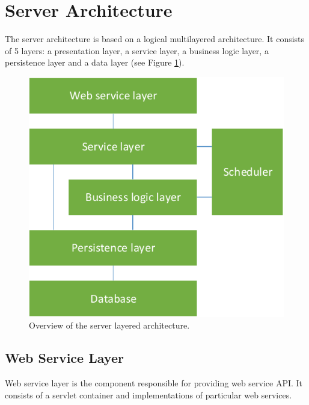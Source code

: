 

\section{Server Architecture}

The server architecture is based on a logical multilayered architecture. It
consists of 5 layers: a presentation layer, a service layer, a business logic layer, 
a persistence layer and a data layer (see Figure
\ref{fig:ServerComponentOverview}).



\begin{figure}[!htb]
        \centering
        \includegraphics{Images/ServerComponentOverview}
        \caption{Overview of the server layered architecture.}
        \label{fig:ServerComponentOverview}
\end{figure}

\subsection{Web Service Layer}
Web service layer is the component responsible for providing web service
API. It consists of a servlet container and implementations of particular
web services.


